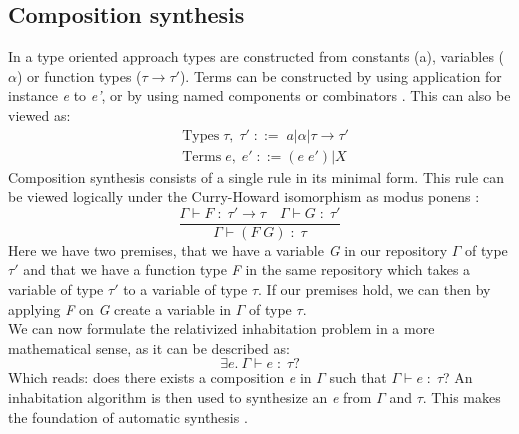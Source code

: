 \subsection{Composition synthesis}
In a type oriented approach types are constructed from constants (a), variables ($\alpha$) or function types ($\tau \to \tau'$). Terms can be constructed by using application for instance \textit{e} to \textit{e'}, or by using named components or combinators \cite{CLSPaper}. This can also be viewed as:
\begin{align*}
	&\text{Types}\; \tau,\;\tau'\; ::=\; a | \alpha | \tau \to \tau'\\
	&\text{Terms}\; e,\; e'\; ::= (e\; e') | X
\end{align*}
Composition synthesis consists of a single rule in its minimal form. This rule can be viewed logically under the Curry-Howard isomorphism as modus ponens \cite{CLSPaper}:
\begin{equation*}
	\frac{\Gamma \vdash F\; : \; \tau' \to \tau \quad \Gamma \vdash G\; : \; \tau'}{\Gamma \vdash (F\; G)\; : \; \tau}
\end{equation*}
Here we have two premises, that we have a variable \textit{G} in our repository $\Gamma$ of type $\tau'$ and that we have a function type \textit{F} in the same repository which takes a variable of type $\tau'$ to a variable of type $\tau$. If our premises hold, we can then by applying \textit{F} on \textit{G} create a variable in $\Gamma$ of type $\tau$.\\
We can now formulate the relativized inhabitation problem in a more mathematical sense, as it can be described as:
\begin{equation*}
	\exists e.\ \Gamma \vdash e\; : \; \tau?
\end{equation*}
Which reads: does there exists a composition \textit{e} in $\Gamma$ such that $\Gamma \vdash e\; : \; \tau$? An inhabitation algorithm is then used to synthesize an \textit{e} from $\Gamma$ and $\tau$. This makes the foundation of automatic synthesis \cite{CLSPaper}.

